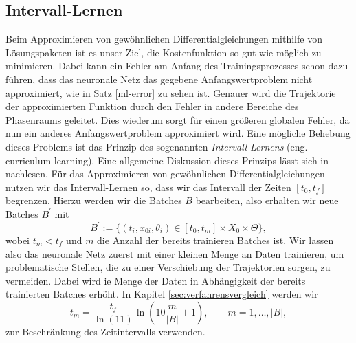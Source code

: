 \subsection{Intervall-Lernen}
\label{subsec:curriculum-learning}
Beim Approximieren von gewöhnlichen Differentialgleichungen mithilfe von Lösungspaketen ist es unser Ziel, die
Kostenfunktion so gut wie möglich zu minimieren. Dabei kann ein Fehler am Anfang des Trainingsprozesses schon dazu
führen, dass das neuronale Netz das gegebene Anfangswertproblem nicht approximiert, wie in Satz \ref{ml-error} zu sehen
ist. Genauer wird die Trajektorie der approximierten Funktion durch den Fehler in andere Bereiche des Phasenraums
geleitet. Dies wiederum sorgt für einen größeren globalen Fehler, da nun ein anderes Anfangswertproblem approximiert
wird. Eine mögliche Behebung dieses Problems ist das Prinzip des sogenannten \textit{Intervall}-\textit{Lernens}
(eng. curriculum learning). Eine allgemeine Diskussion dieses Prinzips lässt sich in \cite{bengioCurriculumLearning2009}
nachlesen. Für das Approximieren von gewöhnlichen Differentialgleichungen nutzen wir das Intervall-Lernen so, dass wir
das Intervall der Zeiten $[t_0, t_f]$ begrenzen. Hierzu werden wir die Batches $B$ bearbeiten, also erhalten wir neue
Batches $B^{\prime}$ mit
\[
    B^{\prime}:=  \{(t_i,x_{0i},\theta_i) \in [t_0,t_m] \times X_0 \times \Theta\},
\]
wobei $t_m<t_f$ und $m$ die Anzahl der bereits trainieren Batches ist. Wir lassen also das neuronale Netz zuerst mit
einer kleinen Menge an Daten trainieren, um problematische Stellen, die zu einer Verschiebung der Trajektorien sorgen,
zu vermeiden. Dabei wird ie Menge der Daten in Abhängigkeit der bereits trainierten Batches erhöht. In Kapitel
\ref{sec:verfahrensvergleich} werden wir
\[
    t_m = \frac{t_f}{\ln(11)} \ln(10 \frac{m}{|B|} + 1), \qquad m = 1, \dots, |B|,
\]
zur Beschränkung des Zeitintervalls verwenden.

